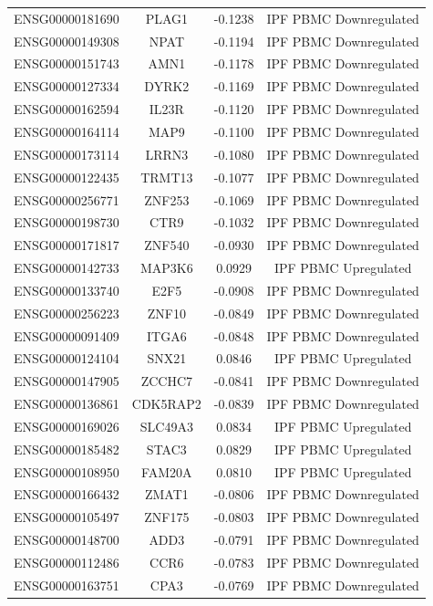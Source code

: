 \documentclass[
]{article}
\begin{document}
\begin{singlespace}
\begin{longtable}[t]{lccc}
ENSG00000181690 & PLAG1 & -0.1238 & IPF PBMC Downregulated\\
ENSG00000149308 & NPAT & -0.1194 & IPF PBMC Downregulated\\
\addlinespace
ENSG00000151743 & AMN1 & -0.1178 & IPF PBMC Downregulated\\
ENSG00000127334 & DYRK2 & -0.1169 & IPF PBMC Downregulated\\
ENSG00000162594 & IL23R & -0.1120 & IPF PBMC Downregulated\\
ENSG00000164114 & MAP9 & -0.1100 & IPF PBMC Downregulated\\
ENSG00000173114 & LRRN3 & -0.1080 & IPF PBMC Downregulated\\
\addlinespace
ENSG00000122435 & TRMT13 & -0.1077 & IPF PBMC Downregulated\\
ENSG00000256771 & ZNF253 & -0.1069 & IPF PBMC Downregulated\\
ENSG00000198730 & CTR9 & -0.1032 & IPF PBMC Downregulated\\
ENSG00000171817 & ZNF540 & -0.0930 & IPF PBMC Downregulated\\
ENSG00000142733 & MAP3K6 & 0.0929 & IPF PBMC Upregulated\\
\addlinespace
ENSG00000133740 & E2F5 & -0.0908 & IPF PBMC Downregulated\\
ENSG00000256223 & ZNF10 & -0.0849 & IPF PBMC Downregulated\\
ENSG00000091409 & ITGA6 & -0.0848 & IPF PBMC Downregulated\\
ENSG00000124104 & SNX21 & 0.0846 & IPF PBMC Upregulated\\
ENSG00000147905 & ZCCHC7 & -0.0841 & IPF PBMC Downregulated\\
\addlinespace
ENSG00000136861 & CDK5RAP2 & -0.0839 & IPF PBMC Downregulated\\
ENSG00000169026 & SLC49A3 & 0.0834 & IPF PBMC Upregulated\\
ENSG00000185482 & STAC3 & 0.0829 & IPF PBMC Upregulated\\
ENSG00000108950 & FAM20A & 0.0810 & IPF PBMC Upregulated\\
ENSG00000166432 & ZMAT1 & -0.0806 & IPF PBMC Downregulated\\
\addlinespace
ENSG00000105497 & ZNF175 & -0.0803 & IPF PBMC Downregulated\\
ENSG00000148700 & ADD3 & -0.0791 & IPF PBMC Downregulated\\
ENSG00000112486 & CCR6 & -0.0783 & IPF PBMC Downregulated\\
ENSG00000163751 & CPA3 & -0.0769 & IPF PBMC Downregulated\\

\end{longtable}
\end{singlespace}
\end{document}
